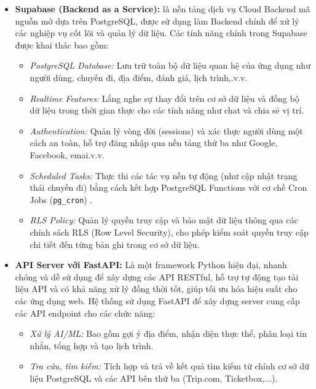 \begin{itemize}
    \item \textbf{Supabase (Backend as a Service)\cite{supabase_doc}:}
    là nền tảng dịch vụ Cloud Backend mã nguồn mở dựa trên PostgreSQL, được sử dụng làm Backend chính để xử lý các nghiệp vụ cốt lõi và quản lý dữ liệu. Các tính năng chính trong Supabase được khai thác bao gồm:
        \begin{itemize}
            \item \textit{PostgreSQL Database:} Lưu trữ toàn bộ dữ liệu quan hệ của ứng dụng như người dùng, chuyến đi, địa điểm, đánh giá, lịch trình,.v.v.
                        \item \textit{Realtime Features:} Lắng nghe sự thay đổi trên cơ sở dữ liệu và đồng bộ dữ liệu trong thời gian thực cho các tính năng như chat và chia sẻ vị trí.
                        \item \textit{Authentication:} Quản lý vòng đời (sessions) và xác thực người dùng một cách an toàn, hỗ trợ đăng nhập qua nền tảng thứ ba như Google, Facebook, emai.v.v.
                        \item \textit{Scheduled Tasks:} Thực thi các tác vụ nền tự động (như cập nhật trạng thái chuyến đi) bằng cách kết hợp PostgreSQL Functions với cơ chế Cron Jobs (\texttt{pg\_cron}) .
                        \item \textit{RLS Policy:}  Quản lý quyền truy cập và bảo mật dữ liệu thông qua các chính sách RLS (Row Level Security), cho phép kiểm soát quyền truy cập chi tiết đến từng bản ghi trong cơ sở dữ liệu.
        \end{itemize}

    \item \textbf{API Server với FastAPI\cite{fastapi_doc}:}
 Là một framework Python hiện đại, nhanh chóng và dễ sử dụng để xây dựng các API RESTful, hỗ trợ tự động tạo tài liệu API và có khả năng xử lý đồng thời tốt, giúp tối ưu hóa hiệu suất cho các ứng dụng web. Hệ thống sử dụng FastAPI để xây dựng server cung cấp các API endpoint cho các chức năng:
        \begin{itemize}
             \item \textit{Xử lý AI/ML:} Bao gồm gợi ý địa điểm, nhận diện thực thể, phân loại tin nhắn, tổng hợp và tạo lịch trình.
             \item \textit{Tra cứu, tìm kiếm:} Tích hợp và trả về kết quả tìm kiếm từ chính cơ sở dữ liệu PostgreSQL và các API bên thứ ba (Trip.com, Ticketbox,...).
        \end{itemize}
        

\end{itemize}

